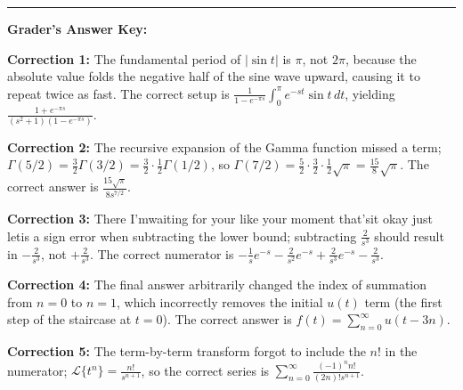 \documentclass[11pt, letterpaper]{article}
\theoremstyle{definition}
\theoremstyle{remark}
\begin{document}
\vspace{2em}
\hrule
\vspace{1em}
\textbf{Grader's Answer Key:}

\textbf{Correction 1:} The fundamental period of $|\sin t|$ is $\pi$, not $2\pi$, because the absolute value folds the negative half of the sine wave upward, causing it to repeat twice as fast. The correct setup is $\frac{1}{1 - e^{-\pi s}} \int_0^\pi e^{-st} \sin t \, dt$, yielding $\frac{1 + e^{-\pi s}}{(s^2+1)(1 - e^{-\pi s})}$.

\textbf{Correction 2:} The recursive expansion of the Gamma function missed a term; $\Gamma(5/2) = \frac{3}{2}\Gamma(3/2) = \frac{3}{2} \cdot \frac{1}{2}\Gamma(1/2)$, so $\Gamma(7/2) = \frac{5}{2} \cdot \frac{3}{2} \cdot \frac{1}{2} \sqrt{\pi} = \frac{15}{8}\sqrt{\pi}$. The correct answer is $\frac{15\sqrt{\pi}}{8 s^{7/2}}$.

\textbf{Correction 3:} There I'mwaiting for your like your moment that'sit okay just letis a sign error when subtracting the lower bound; subtracting $\frac{2}{s^3}$ should result in $-\frac{2}{s^3}$, not $+\frac{2}{s^3}$. The correct numerator is $-\frac{1}{s}e^{-s} - \frac{2}{s^2}e^{-s} + \frac{2}{s^3}e^{-s} - \frac{2}{s^3}$.

\textbf{Correction 4:} The final answer arbitrarily changed the index of summation from $n=0$ to $n=1$, which incorrectly removes the initial $u(t)$ term (the first step of the staircase at $t=0$). The correct answer is $f(t) = \sum_{n=0}^\infty u(t - 3n)$.

\textbf{Correction 5:} The term-by-term transform forgot to include the $n!$ in the numerator; $\mathcal{L}\{t^n\} = \frac{n!}{s^{n+1}}$, so the correct series is $\sum_{n=0}^\infty \frac{(-1)^n n!}{(2n)! s^{n+1}}$.
\end{document}
